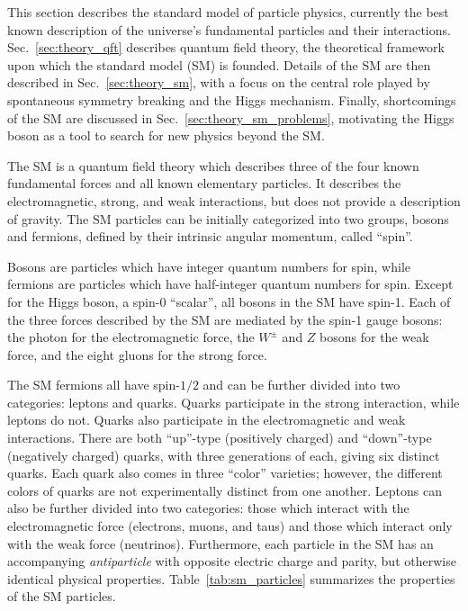 This section describes the standard model of particle physics, currently the best known description of the universe's fundamental particles and their interactions.
Sec.~\ref{sec:theory_qft} describes quantum field theory, the theoretical framework upon which the standard model (SM) is founded.
Details of the SM are then described in Sec.~\ref{sec:theory_sm}, with a focus on the central role played by spontaneous symmetry breaking and the Higgs mechanism.
Finally, shortcomings of the SM are discussed in Sec.~\ref{sec:theory_sm_problems}, motivating the Higgs boson as a tool to search for new physics beyond the SM.

The SM is a quantum field theory which describes three of the four known fundamental forces and all known elementary particles.
It describes the electromagnetic, strong, and weak interactions, but does not provide a description of gravity.
The SM particles can be initially categorized into two groups, bosons and fermions, defined by their intrinsic angular momentum, called ``spin''.

Bosons are particles which have integer quantum numbers for spin, while fermions are particles which have half-integer quantum numbers for spin.
Except for the Higgs boson, a spin-0 ``scalar'', all bosons in the SM have spin-1.
Each of the three forces described by the SM are mediated by the spin-1 gauge bosons: the photon for the electromagnetic force, the $W^\pm$ and $Z$ bosons for the weak force, and the eight gluons for the strong force.

The SM fermions all have spin-$1/2$ and can be further divided into two categories: leptons and quarks.
Quarks participate in the strong interaction, while leptons do not.
Quarks also participate in the electromagnetic and weak interactions.
There are both ``up''-type (positively charged) and ``down''-type (negatively charged) quarks, with three generations of each, giving six distinct quarks.
Each quark also comes in three ``color'' varieties; however, the different colors of quarks are not experimentally distinct from one another.
Leptons can also be further divided into two categories: those which interact with the electromagnetic force (electrons, muons, and taus) and those which interact only with the weak force (neutrinos).
Furthermore, each particle in the SM has an accompanying \emph{antiparticle} with opposite electric charge and parity, but otherwise identical physical properties.
Table~\ref{tab:sm_particles} summarizes the properties of the SM particles.

